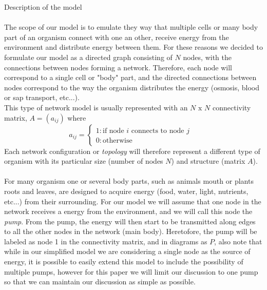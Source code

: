 \documentclass{amsart}
\theoremstyle{plain}
\numberwithin{equation}{section}
\begin{document}
Description of the model\\
\\The scope of our model is to emulate they way that multiple cells or many body part of an organism connect with one an other, receive energy from the environment and distribute energy between them.
For these reasons we decided to formulate our model as a directed graph consisting of $N$ nodes, with the connections between nodes forming a network. Therefore, each node will correspond to a single cell or "body" part, and the directed connections between nodes correspond to the way the organism distributes the energy (osmosis, blood or sap transport, etc...).
\\This type of network model is usually represented with an $N \text{ x } N$ connectivity matrix, $A=(a_{ij})$ where \begin{displaymath}
   a_{ij}= \left\{
     \begin{array}{lr}
       1 : \text{if node }i \text{ connects to node } j &\\
       0 : \text{otherwise}&
     \end{array}
   \right.
\end{displaymath}
Each network configuration or \textit{topology} will therefore represent a different type of organism with its particular size (number of nodes $N$) and structure (matrix $A$). 
\\
\\For many organism one or several body parts, such as animals mouth or plants roots and leaves, are designed to acquire energy (food, water, light, nutrients, etc...) from their surrounding.
For our model we will assume that one node in the network receives a energy from the environment, and we will call this node the \textit{pump}. From the pump, the energy will then start to be transmitted along edges to all the other nodes in the network (main body). Heretofore, the pump will be labeled as node 1 in the connectivity matrix, and in diagrams as $P$, also note that while in our simplified model we are considering a single node as the source of energy, it is possible to easily extend this model to include the possibility of multiple pumps, however for this paper we will limit our discussion to one pump so that we can maintain our discussion as simple as possible.
\end{document}
